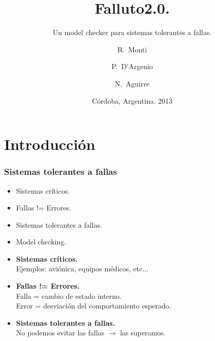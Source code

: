 \documentclass[serif]{beamer}
\title[Falluto2.0] %
{Falluto2.0.}
\subtitle{ Un model checker para sistemas tolerantes a fallas.}
\author[Monti] %
{R.~Monti \and P.~D'Argenio \and N.~Aguirre}
\institute[FaMAF - UNC] %
{
Facultad de Matem\'atica, Astronom\'ia y F\'isica, Universidad Nacional de 
Córdoba
}
\date[4-2-2013] %
{Córdoba, Argentina. 2013}
\begin{document}
\frame{\titlepage}


\section{Introducción}
\begin{frame}
\frametitle{Sistemas tolerantes a fallas}
\begin{itemize}\itemsep15pt
\item Sistemas críticos.
\item Fallas != Errores.
\item Sistemas tolerantes a fallas.
\item Model checking.
\end{itemize}
\end{frame}


\begin{frame}
\begin{itemize}\itemsep15pt
\item {\Large \bfseries Sistemas críticos.}\\[5pt]
\hspace{0.5cm}Ejemplos: aviónica, equipos médicos, etc...
\item {\Large \bfseries Fallas != Errores.}\\[5pt]
\hspace{0.5cm}Falla = cambio de estado interno.\\
\hspace{0.5cm}Error = desviación del comportamiento esperado.
\item {\Large \bfseries Sistemas tolerantes a fallas.}\\[5pt]
\hspace{0.5cm}No podemos evitar las fallas $\longrightarrow$ las superamos.
\end{itemize}
\end{frame}
\end{document}
